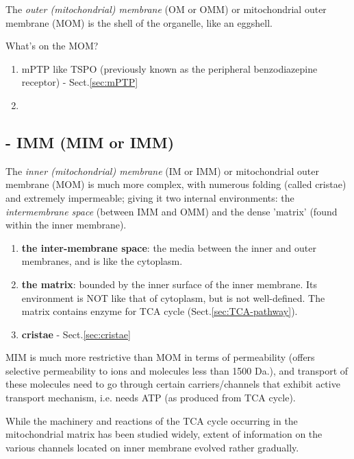 The {\it outer (mitochondrial) membrane} (OM or OMM) or mitochondrial outer
membrane (MOM) is the shell of the organelle, like an eggshell.

What's on the MOM?
\begin{enumerate}
  \item mPTP like TSPO (previously known as the peripheral benzodiazepine
  receptor) - Sect.\ref{sec:mPTP}


  \item
\end{enumerate}

\subsection{- IMM (MIM or IMM)}
\label{sec:mito-IMM}
\label{sec:MIM-mito}

The {\it inner (mitochondrial) membrane} (IM or IMM) or mitochondrial outer
membrane (MOM) is much more complex, with numerous folding (called cristae) and
extremely impermeable; giving it two internal environments: the {\it
intermembrane space} (between IMM and OMM) and the dense 'matrix' (found within
the inner membrane).

\begin{enumerate}
  \item {\bf the inter-membrane space}: the media between the inner and outer
  membranes, and is like the cytoplasm.

  \item {\bf the matrix}: bounded by the inner surface of the inner membrane.
  Its environment is NOT like that of cytoplasm, but is not well-defined. The
  matrix contains  enzyme for TCA cycle (Sect.\ref{sec:TCA-pathway}).

  \item {\bf cristae} - Sect.\ref{sec:cristae}
\end{enumerate}

MIM is much more restrictive than MOM in terms of permeability (offers selective
permeability to ions and molecules less than 1500 Da.), and transport of these
molecules need to go through certain carriers/channels that exhibit active
transport mechanism, i.e. needs ATP (as produced from TCA cycle).

While the machinery and reactions of the TCA cycle occurring in the
mitochondrial matrix has been studied widely, extent of information on the
various channels located on inner membrane evolved rather gradually.

